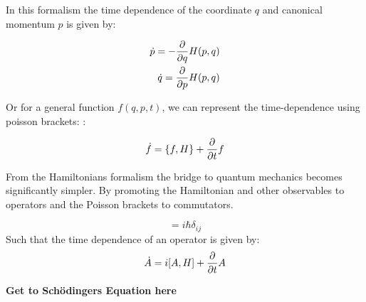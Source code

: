 In this formalism the time dependence of the coordinate $q$ and canonical momentum $p$ is given by:

\begin{align}
    \dot{p} = - \frac{\partial }{\partial q} &H(p, q) \\
    \dot{q} = \frac{\partial }{\partial p} &H(p, q)
\end{align}

Or for a general function $f(q, p, t)$, we can represent the time-dependence using poisson brackets:
:

\begin{equation}
    \dot{f} = \{f, H\} + \frac{\partial }{\partial t} f 
\end{equation}

From the Hamiltonians formalism the bridge to quantum mechanics becomes significantly simpler. By promoting the Hamiltonian and other observables to operators and the Poisson brackets to commutators. 

\begin{equation}
    [p_i, q_j] = i \hbar \delta_{ij}
\end{equation}
Such that the time dependence of an operator is given by:
\begin{equation}
    \dot{A} = i \comm{A}{H} + \pfrac{}{t} A
\end{equation}

\textbf{Get to Schödingers Equation here}
